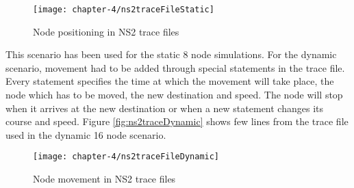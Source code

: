 \begin{figure}[H]
  \centering
  \texttt{[image: chapter-4/ns2traceFileStatic]}
  \caption{Node positioning in NS2 trace files}
  \label{fig:ns2traceFileStatic}
\end{figure}

This scenario has been used for the static 8 node simulations. For the dynamic scenario, movement had to be added through special statements in the trace file. Every statement specifies the time at which the movement will take place, the node which has to be moved, the new destination and speed. The node will stop when it arrives at the new destination or when a new statement changes its course and speed. Figure \ref{fig:ns2traceDynamic} shows few lines from the trace file used in the dynamic 16 node scenario.

\begin{figure}[H]
  \centering
  \texttt{[image: chapter-4/ns2traceFileDynamic]}
  \caption{Node movement in NS2 trace files}
  \label{fig:ns2traceFileDynamic}
\end{figure}




